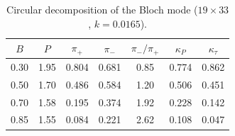 \documentclass[prb,reprint,amsmath,amssymb,superscriptaddress,floatfix]{revtex4-2}
\newcommand{\kP}{\kappa_P}
\newcommand{\kt}{\kappa_\tau}
\begin{document}
\begin{table}[h]
\caption{\label{tab:circ}Circular decomposition of the Bloch mode ($19\times33$, $k=0.0165$).}
\begin{ruledtabular}
\begin{tabular}{ccccccc}
$B$ & $P$ & $\pi_+$ & $\pi_-$ & $\pi_-/\pi_+$ & $\kP$ & $\kt$\\
\hline
0.30 & 1.95 & 0.804 & 0.681 & 0.85 & 0.774 & 0.862\\
0.50 & 1.70 & 0.486 & 0.584 & 1.20 & 0.506 & 0.451\\
0.70 & 1.58 & 0.195 & 0.374 & 1.92 & 0.228 & 0.142\\
0.85 & 1.55 & 0.084 & 0.221 & 2.62 & 0.108 & 0.047\\
\end{tabular}
\end{ruledtabular}
\end{table}


\end{document}
